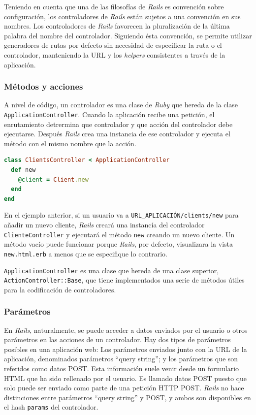 Teniendo en cuenta que una de las filosofías de \textit{Rails} es convención sobre configuración, los controladores de \textit{Rails} están sujetos a una convención en sus nombres. Los controladores de \textit{Rails} favorecen la pluralización de la última palabra del nombre del controlador. Siguiendo ésta convención, se permite utilizar generadores de rutas por defecto sin necesidad de especificar la ruta o el controlador, manteniendo la URL y los \textit{helpers} consistentes a través de la aplicación.

\subsubsection{Métodos y acciones}
A nivel de código, un controlador es una clase de \textit{Ruby} que hereda de la clase \texttt{ApplicationController}. Cuando la aplicación recibe una petición, el enrutamiento detrermina que controlador y que acción del controlador debe ejecutarse. Después \textit{Rails} crea una instancia de ese controlador y ejecuta el método con el mismo nombre que la acción.

\begin{lstlisting}[language=Ruby]
class ClientsController < ApplicationController
  def new
  	@client = Client.new
  end
end
\end{lstlisting}

En el ejemplo anterior, si un usuario va a \texttt{URL\_APLICACIÓN/clients/new} para añadir un nuevo cliente, \textit{Rails} creará una instancía del controlador \texttt{ClienteController} y ejecutará el método \texttt{new} creando un nuevo cliente. Un método vacío puede funcionar porque \textit{Rails}, por defecto, visualizara la vista \texttt{new.html.erb} a menos que se especifique lo contrario.

\texttt{ApplicationController} es una clase que hereda de una clase superior, \texttt{ActionController::Base}, que tiene implementados una serie de métodos útiles para la codificación de controladores.


\subsubsection{Parámetros}
En \textit{Rails}, naturalmente, se puede acceder a datos enviados por el usuario o otros parámetros en las acciones de un controlador. Hay dos tipos de parámetros posibles en una aplicación web: Los parámetros enviados junto con la URL de la aplicación, denominados parámetros ``query string''; y los parámetros que son referidos como datos POST. Esta información suele venir desde un formulario HTML que ha sido rellenado por el usuario. Es llamado datos POST puesto que solo puede ser enviado como parte de una petición HTTP POST. \textit{Rails} no hace distinciones entre parámetros ``query string'' y POST, y ambos son disponibles en el hash \texttt{params} del controlador.


